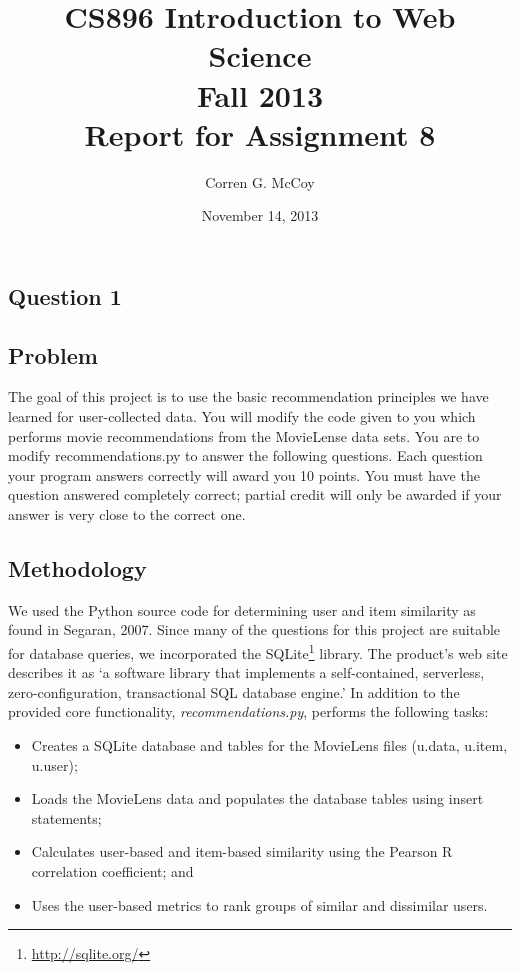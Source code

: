 \documentclass[letterpaper,11pt]{report}
\begin{document}
 
\begin{savenotes}
\pagestyle{plain}
\title{CS896 Introduction to Web Science\\Fall 2013\\Report for Assignment 8}
\author{Corren G. McCoy}
 
\date{November 14, 2013}
\maketitle

\renewcommand*\thesection{\arabic{section}}
\setcounter{section}{0}

\setcounter{tocdepth}{4}
\tableofcontents
 \listoftables
\newpage


\section{Question 1}
\subsection{Problem}The goal of this project is to use the basic recommendation principles we have learned for user-collected data. You will modify the code given to you which performs movie recommendations from the MovieLense data sets. You are to modify recommendations.py to answer the following questions. Each question your program answers correctly will award you 10 points. You must have the question answered completely correct; partial credit will only be awarded if your answer is very close to the correct one.

\subsection{Methodology}We used the Python source code for determining user and item similarity as found in Segaran, 2007\cite{segaran2007programming}. Since many of the questions for this project are suitable for database queries, we incorporated the SQLite\footnote{\url{http://sqlite.org/}} library. The product's web site describes it as `a software library that implements a self-contained, serverless, zero-configuration, transactional SQL database engine.' In addition to the provided core functionality, \emph{recommendations.py}, performs the following tasks:

\begin{itemize}
\item Creates a SQLite database and tables for the MovieLens files (u.data, u.item, u.user);
\item Loads the MovieLens data and populates the database tables using insert statements;
\item Calculates user-based and item-based similarity using the Pearson R correlation coefficient; and
\item Uses the user-based metrics to rank groups of similar and dissimilar users.
\end{itemize}


\end{savenotes}
\end{document}
